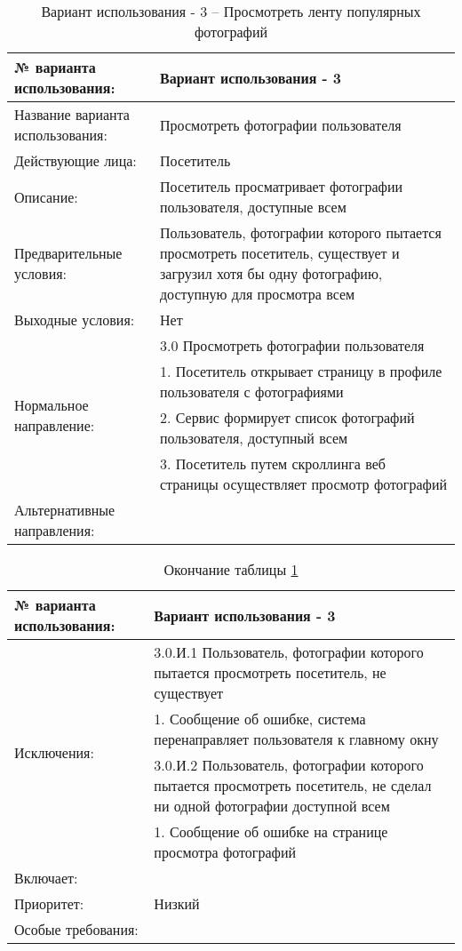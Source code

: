 \begin{table}[H]
  \caption{\onehalfspacing Вариант использования - 3 – Просмотреть ленту популярных фотографий}\label{use-case-3-table}
  \begin{tabular}{|p{6cm}|p{10cm}|}
  \hline № варианта использования: & Вариант использования - 3 \\
  \hline Название варианта использования: & Просмотреть фотографии пользователя \\
  \hline Действующие лица: & Посетитель \\
  \hline Описание: & Посетитель просматривает фотографии пользователя, доступные всем \\
  \hline Предварительные условия: & Пользователь, фотографии которого пытается просмотреть посетитель, существует и загрузил хотя бы одну фотографию, доступную для просмотра всем \\
  \hline Выходные условия: & Нет \\
  \hline \multirow{4}{*}{Нормальное направление:} & 3.0 Просмотреть фотографии пользователя \\
  \cline{2-2} & 1. Посетитель открывает страницу в профиле пользователя с фотографиями \\
  \cline{2-2} & 2. Сервис формирует список фотографий пользователя, доступный всем \\
  \cline{2-2} & 3. Посетитель путем скроллинга веб страницы осуществляет просмотр фотографий \\
  \hline Альтернативные направления: &  \\
  \end{tabular}
\end{table}
\begin{table}[H]
  \caption*{Окончание таблицы \ref{use-case-3-table}}
  \begin{tabular}{|p{6cm}|p{10cm}|}
  \hline № варианта использования: & Вариант использования - 3 \\
  \hline \multirow{4}{*}{Исключения:} & 3.0.И.1 Пользователь, фотографии которого пытается просмотреть посетитель, не существует \\
  \cline{2-2} & 1. Сообщение об ошибке, система перенаправляет пользователя к главному окну \\
  \cline{2-2} & 3.0.И.2 Пользователь, фотографии которого пытается просмотреть посетитель, не сделал ни одной фотографии доступной всем \\
  \cline{2-2} & 1. Сообщение об ошибке на странице просмотра фотографий \\
  \hline Включает: &  \\
  \hline Приоритет: & Низкий \\
  \hline Особые требования: &  \\
  \hline 
  \end{tabular}
\end{table}

